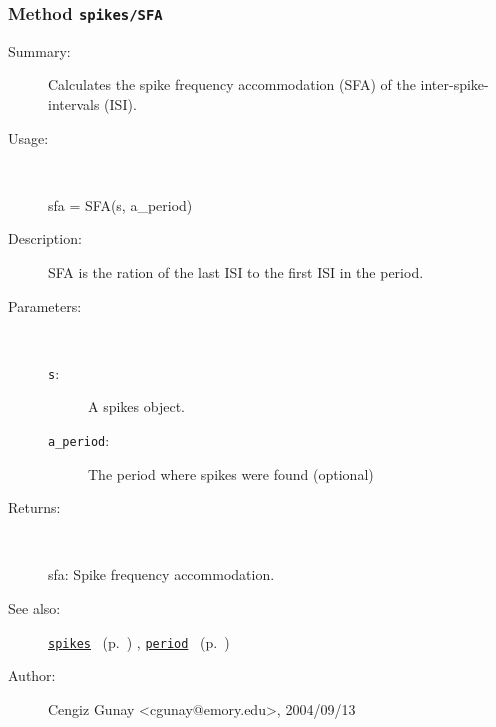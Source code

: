 \subsubsection[Method \texttt{SFA}]{Method \texttt{spikes/SFA}}%
%
\label{ref_spikes__SFA}%
\hypertarget{ref_spikes__SFA}{}%
\begin{description}
\item[Summary:]Calculates the spike frequency accommodation (SFA) of the 
	inter-spike-intervals (ISI).
%
\item[Usage:]~%
\begin{lyxcode}%
sfa = SFA(s, a\_period)
%
\end{lyxcode}%
%
\item[Description:]%
SFA is the ration of the last ISI to the first ISI in the period.
\item[Parameters:]~
\begin{description}%
\item[\texttt{s}:]
 A spikes object.
\item[\texttt{a\_period}:]
 The period where spikes were found (optional)
\end{description}%
%
\item[Returns:
]~

	sfa: Spike frequency accommodation.
%
%
\item[See also:]%
\hyperlink{ref_spikes}{\texttt{spikes}}%
\ (p.~\pageref{ref_spikes})%
%
, \hyperlink{ref_period}{\texttt{period}}%
\ (p.~\pageref{ref_period})%
%
%
\item[Author:]%
Cengiz Gunay <cgunay@emory.edu>, 2004/09/13
%
\end{description}
\methodline%
